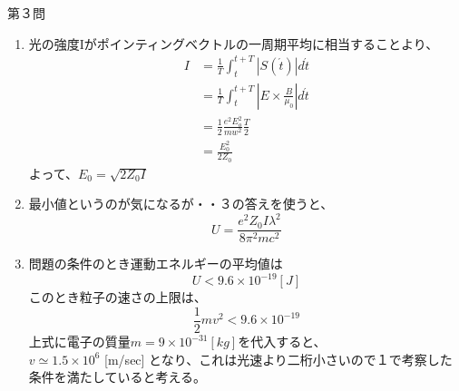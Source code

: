 \documentclass[fleqn]{jbook}
\begin{document}
\begin{answer}{第３問}{}
\begin{enumerate}
2で求めた運動エネルギー $u(t)$ の平均値を求める。
\begin{equation}
	\begin{split}
<u(t)>&=\frac{1}{T}\int_t^{t+T}\frac{1}{2}\frac{e^{2}E_{o}^{2}}{mw^{2}}\cos^{2}(w\acute{t}-ky_{0}+\phi)d\acute{t} \\
&=\frac{1}{T}\frac{1}{2}\frac{e^{2}E_{o}^{2}}{mw^{2}}\int_{t}^{t+T}\cos^{2}(w\acute{t}-ky_{0}+\phi)d\acute{t} \\
&=\frac{1}{2}\frac{e^{2}E_{o}^{2}}{mw^2}\frac{T}{2} \\
&=\frac{e^2E_{o}^{2}}{4mw^2}
\end{split}
\end{equation}
物理的意味は、仕事をされない、周波数が高いときに0になるとか。。

\item
光の強度Iがポインティングベクトルの一周期平均に相当することより、
\begin{equation}
	\begin{split}
I&=\frac{1}{T}\int_t^{t+T}|S(\acute{t})|d\acute{t} \\
&=\frac{1}{T}\int_{t}^{t+T}|E \times \frac{B}{\mu_{0}}|d\acute{t} \\
&=\frac{1}{2}\frac{e^{2}E_{o}^{2}}{mw^2}\frac{T}{2} \\
&=\frac{E_0^2}{2Z_0}
\end{split}
\end{equation}
よって、$E_0=\sqrt{2Z_0I}$

\item
最小値というのが気になるが・・３の答えを使うと、\\
\begin{equation}
U  = \frac{e^2Z_0I \lambda^2}{8\pi^2mc^2} 
\end{equation}

\item
問題の条件のとき運動エネルギーの平均値は
\begin{equation}
U < 9.6 \times 10^{-19} [J]
\end{equation}
このとき粒子の速さの上限は、
\begin{equation}
\frac{1}{2}mv^2 < 9.6 \times 10^{-19}
\end{equation}
上式に電子の質量$m=9\times10^{-31}[kg]$を代入すると、\\
$v \simeq 1.5 \times 10 ^{6}$ [m/sec] となり、これは光速より二桁小さいので１で考察した条件を満たしていると考える。
\end{enumerate}
\end{answer}
\end{document}
